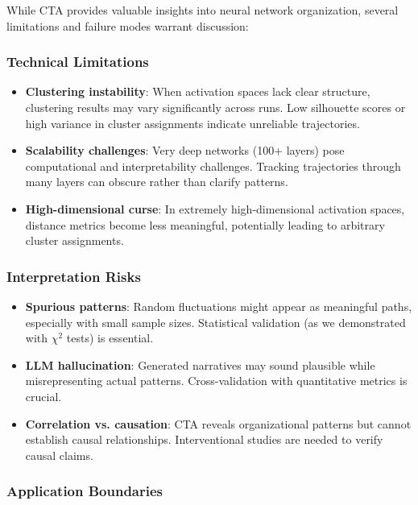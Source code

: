 While CTA provides valuable insights into neural network organization, several limitations and failure modes warrant discussion:

\subsubsection{Technical Limitations}

\begin{itemize}
    \item \textbf{Clustering instability}: When activation spaces lack clear structure, clustering results may vary significantly across runs. Low silhouette scores or high variance in cluster assignments indicate unreliable trajectories.
    \item \textbf{Scalability challenges}: Very deep networks (100+ layers) pose computational and interpretability challenges. Tracking trajectories through many layers can obscure rather than clarify patterns.
    \item \textbf{High-dimensional curse}: In extremely high-dimensional activation spaces, distance metrics become less meaningful, potentially leading to arbitrary cluster assignments.
\end{itemize}

\subsubsection{Interpretation Risks}

\begin{itemize}
    \item \textbf{Spurious patterns}: Random fluctuations might appear as meaningful paths, especially with small sample sizes. Statistical validation (as we demonstrated with $\chi^2$ tests) is essential.
    \item \textbf{LLM hallucination}: Generated narratives may sound plausible while misrepresenting actual patterns. Cross-validation with quantitative metrics is crucial.
    \item \textbf{Correlation vs. causation}: CTA reveals organizational patterns but cannot establish causal relationships. Interventional studies are needed to verify causal claims.
\end{itemize}

\subsubsection{Application Boundaries}

